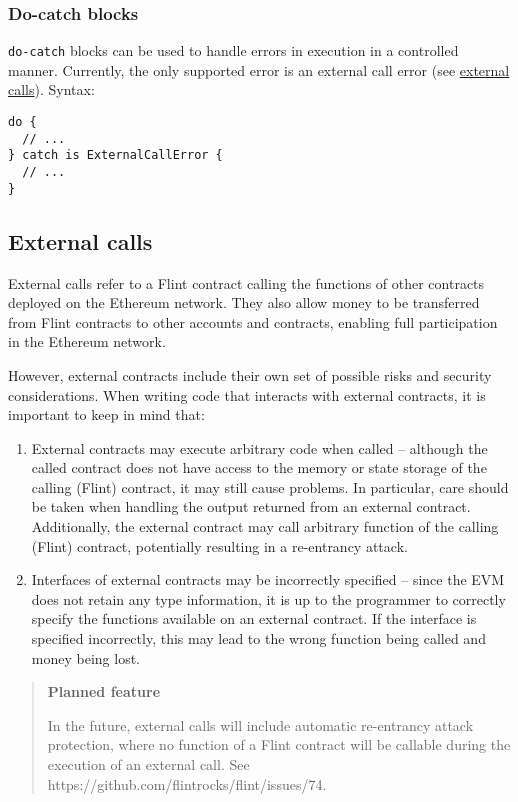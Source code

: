 \subsubsection{Do-catch blocks}
\label{sec:appendix-b-do-catch-blocks}

\texttt{do-catch} blocks can be used to handle errors in execution in a controlled manner. Currently, the only supported error is an external call error (see \hyperref[sec:appendix-b-external-calls]{external calls}). Syntax:

\begin{verbatim}
do {
  // ...
} catch is ExternalCallError {
  // ...
}
\end{verbatim}

\subsection{External calls}
\label{sec:appendix-b-external-calls}

External calls refer to a Flint contract calling the functions of other contracts deployed on the Ethereum network. They also allow money to be transferred from Flint contracts to other accounts and contracts, enabling full participation in the Ethereum network.

However, external contracts include their own set of possible risks and security considerations. When writing code that interacts with external contracts, it is important to keep in mind that:

\begin{enumerate}
	\item External contracts may execute arbitrary code when called – although the called contract does not have access to the memory or state storage of the calling (Flint) contract, it may still cause problems. In particular, care should be taken when handling the output returned from an external contract. Additionally, the external contract may call arbitrary function of the calling (Flint) contract, potentially resulting in a re-entrancy attack.
	\item Interfaces of external contracts may be incorrectly specified – since the EVM does not retain any type information, it is up to the programmer to correctly specify the functions available on an external contract. If the interface is specified incorrectly, this may lead to the wrong function being called and money being lost.
\end{enumerate}

\begin{quote}
\textbf{Planned feature}

In the future, external calls will include automatic re-entrancy attack protection, where no function of a Flint contract will be callable during the execution of an external call. See https://github.com/flintrocks/flint/issues/74.
\end{quote}

